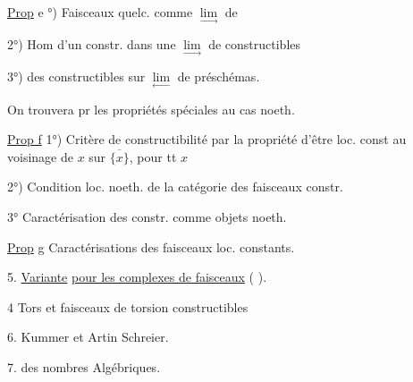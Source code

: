 \uline{Prop} e °) Faisceaux quelc. comme $\underset{\longrightarrow}{\lim}$ de 

2°) Hom d'un constr. dans une $\underset{\longrightarrow}{\lim}$ de constructibles

3°)  des constructibles sur $\underset{\longleftarrow}{\lim}$ de préschémas.


On trouvera pr les propriétés spéciales au cas noeth.

\uline{Prop f} 1°) Critère de constructibilité par la propriété d'être loc. const au voisinage de $x$ sur $\overline{\{x\}}$, pour tt $x$

2°) Condition loc. noeth. de la catégorie des faisceaux constr.

3°  Caractérisation des constr. comme objets noeth.

\uline{Prop} g \quad Caractérisations des faisceaux loc. constants.

5. \uline{Variante} \uline{pour les complexes de faisceaux}  ( ).

 4 Tors et faisceaux de torsion constructibles

6. Kummer et Artin Schreier.

7.  des nombres Algébriques.



